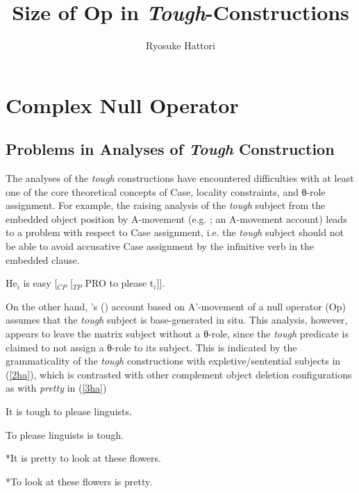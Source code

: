 \documentclass[output=paper,colorlinks,citecolor=brown,
]{langscibook}
\author{Ryosuke Hattori \affiliation{Kobe Gakuin University}}
\title{Size of Op in \textit{Tough}-Constructions}
\begin{document}
\maketitle

\section{Complex Null Operator}
\subsection{Problems in Analyses of \textit{Tough} Construction}
The analyses of the \textit{tough} constructions have encountered difficulties with at least one of the core theoretical concepts of Case, locality constraints, and θ-role assignment. For example, the raising analysis of the \textit{tough} subject from the embedded object position by A-movement (e.g. \citeauthor{Rosenbaum1967} \citeyear{Rosenbaum1967}; an A-movement account) leads to a problem with respect to Case assignment, i.e. the \textit{tough} subject should not be able to avoid accusative Case assignment by the infinitive verb in the embedded clause.

\begin{exe}
\ex \label{1ha}
He$_{i}$ is easy [$_{CP}$ [$_{TP}$ PRO to please t$_{i}$]].
\end{exe}

On the other hand, \citeauthor{Chomsky1977}'s (\citeyear{Chomsky1977}) account based on A'-movement of a null operator (Op) assumes that the \textit{tough} subject is base-generated in situ. This analysis, however, appears to leave the matrix subject without a θ-role, since the \textit{tough} predicate is claimed to not assign a θ-role to its subject. This is indicated by the grammaticality of the \textit{tough} constructions with expletive/sentential subjects in (\ref{2ha}), which is contrasted with other complement object deletion configurations as with \textit{pretty} in (\ref{3ha}) 

\begin{exe}
\ex \label{2ha}
\begin{xlist}
\ex \label{2aha}
It is tough to please linguists.

\ex \label{2bha}
To please linguists is tough.

\end{xlist}

\ex \label{3ha}
\begin{xlist}
\ex \label{3aha}
*It is pretty to look at these flowers.

\ex \label{3bha}
*To look at these flowers is pretty.
\end{xlist}
\end{exe}
\end{document}
